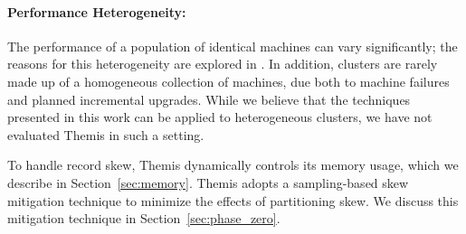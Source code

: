 \paragraph{Performance Heterogeneity:} The performance of a
population of identical machines can vary significantly; the reasons for this
heterogeneity are explored in \cite{stutterfault}. In addition, clusters are
rarely made up of a homogeneous collection of machines, due both to machine
failures and planned incremental upgrades. While we believe that the techniques
presented in this work can be applied to heterogeneous clusters, we have not
evaluated Themis in such a setting.

To handle record skew, Themis dynamically controls its memory usage, which we
describe in Section~\ref{sec:memory}.  Themis adopts a sampling-based skew
mitigation technique to minimize the effects of partitioning skew.  We discuss
this mitigation technique in Section~\ref{sec:phase_zero}.
